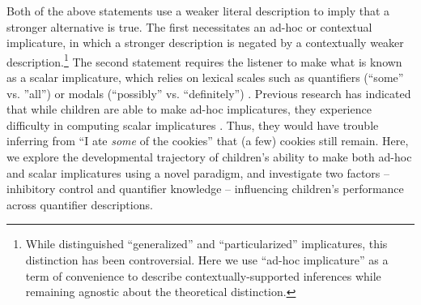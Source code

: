 \documentclass[man]{apa2}
\begin{document}
Both of the above statements use a weaker literal description to imply that a stronger alternative is true. The first necessitates an ad-hoc or contextual implicature, in which a stronger description is negated by a contextually weaker description.\footnote{While  distinguished ``generalized'' and ``particularized'' implicatures, this distinction has been controversial. Here we use ``ad-hoc implicature'' as a term of convenience to describe contextually-supported inferences while remaining agnostic about the theoretical distinction.} The second statement requires the listener to make what is known as a scalar implicature, which relies on lexical scales such as quantifiers (``some'' vs. ''all'') or modals (``possibly'' vs. ``definitely'') \cite{horn1972}. Previous research has indicated that while children are able to make ad-hoc implicatures, they experience difficulty in computing scalar implicatures \cite{stiller2014}. Thus, they would have trouble inferring from ``I ate \emph{some} of the cookies'' that (a few) cookies still remain. Here, we explore the developmental trajectory of children's ability to make both ad-hoc and scalar implicatures using a novel paradigm, and investigate two factors -- inhibitory control and quantifier knowledge -- influencing children's performance across quantifier descriptions. 

\end{document}
